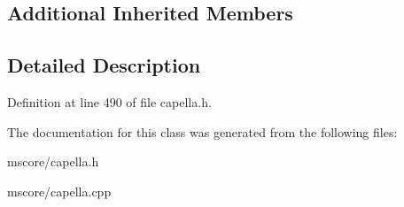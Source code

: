 \subsection*{Additional Inherited Members}


\subsection{Detailed Description}


Definition at line 490 of file capella.\+h.



The documentation for this class was generated from the following files\+:\begin{DoxyCompactItemize}
\item 
mscore/capella.\+h\item 
mscore/capella.\+cpp\end{DoxyCompactItemize}
